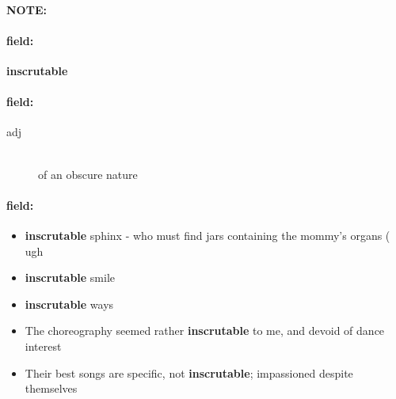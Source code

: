 \documentclass[12pt]{article}
\newenvironment{note}{\paragraph{NOTE:}}{}
\newenvironment{field}{\paragraph{field:}}{}
\begin{document}
\begin{note}
\begin{field}
\textbf{\large inscrutable}
\end{field}


\begin{field}
\begin{description}
\item[adj] \hfill \\ 
of an obscure nature

\end{description}
\end{field}

\begin{field}
\begin{itemize}
\item \textbf{inscrutable} sphinx - who must find jars containing the mommy's organs ( ugh
\item \textbf{inscrutable} smile
\item \textbf{inscrutable} ways
\item The choreography seemed rather \textbf{inscrutable} to me, and devoid of dance interest
\item Their best songs are specific, not \textbf{inscrutable}; impassioned despite themselves
\end{itemize}
\end{field}
\end{note}
\end{document}
